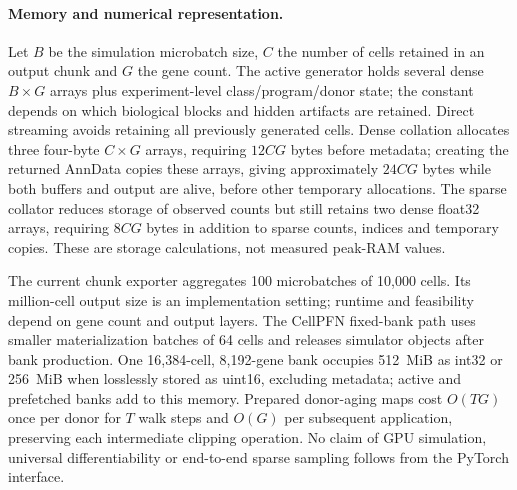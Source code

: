 \paragraph{Memory and numerical representation.}
Let $B$ be the simulation microbatch size, $C$ the number of cells retained in an output chunk and $G$ the gene count. The active generator holds several dense $B\times G$ arrays plus experiment-level class/program/donor state; the constant depends on which biological blocks and hidden artifacts are retained. Direct streaming avoids retaining all previously generated cells. Dense collation allocates three four-byte $C\times G$ arrays, requiring $12CG$ bytes before metadata; creating the returned AnnData copies these arrays, giving approximately $24CG$ bytes while both buffers and output are alive, before other temporary allocations. The sparse collator reduces storage of observed counts but still retains two dense float32 arrays, requiring $8CG$ bytes in addition to sparse counts, indices and temporary copies. These are storage calculations, not measured peak-RAM values.

The current chunk exporter aggregates 100 microbatches of 10,000 cells. Its million-cell output size is an implementation setting; runtime and feasibility depend on gene count and output layers. The CellPFN fixed-bank path uses smaller materialization batches of 64 cells and releases simulator objects after bank production. One 16,384-cell, 8,192-gene bank occupies 512~MiB as int32 or 256~MiB when losslessly stored as uint16, excluding metadata; active and prefetched banks add to this memory. Prepared donor-aging maps cost $O(TG)$ once per donor for $T$ walk steps and $O(G)$ per subsequent application, preserving each intermediate clipping operation. No claim of GPU simulation, universal differentiability or end-to-end sparse sampling follows from the PyTorch interface.
